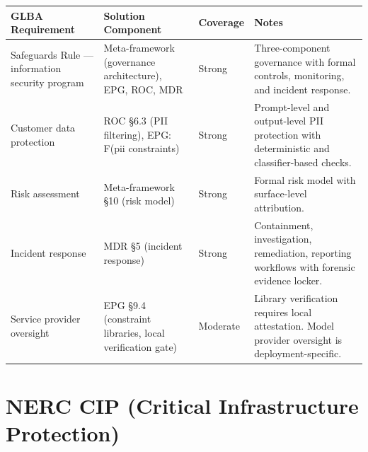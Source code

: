 \begin{table}[ht]
  \centering\small
  \begin{tabular}{@{}>{\raggedright\arraybackslash}p{2.98cm}>{\raggedright\arraybackslash}p{3.63cm}>{\raggedright\arraybackslash}p{1.10cm}>{\raggedright\arraybackslash}p{6.29cm}@{}}
  \toprule
  GLBA Requirement & Solution Component & Coverage & Notes \\
  \midrule
  Safeguards Rule --- information security program & Meta-framework (governance architecture), EPG, ROC, MDR & Strong & Three-component governance with formal controls, monitoring, and incident response. \\
  Customer data protection & ROC \S{}6.3 (PII filtering), EPG: F(pii constraints) & Strong & Prompt-level and output-level PII protection with deterministic and classifier-based checks. \\
  Risk assessment & Meta-framework \S{}10 (risk model) & Strong & Formal risk model with surface-level attribution. \\
  Incident response & MDR \S{}5 (incident response) & Strong & Containment, investigation, remediation, reporting workflows with forensic evidence locker. \\
  Service provider oversight & EPG \S{}9.4 (constraint libraries, local verification gate) & Moderate & Library verification requires local attestation. Model provider oversight is deployment-specific. \\
  \bottomrule
  \end{tabular}
\end{table}




\section{NERC CIP (Critical Infrastructure Protection)}
\label{sec:regmap-7}


